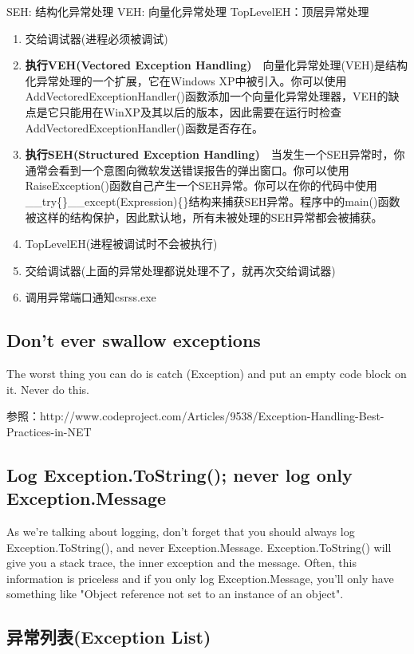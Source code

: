 \documentclass{book}
\begin{document}
SEH: 结构化异常处理
VEH: 向量化异常处理
TopLevelEH：顶层异常处理

\begin{enumerate}
\setcounter{enumi}{0}
\item{交给调试器(进程必须被调试)}
\item{\textbf{执行VEH(Vectored Exception Handling)}}~~向量化异常处理(VEH)是结构化异常处理的一个扩展，它在Windows XP中被引入。你可以使用AddVectoredExceptionHandler()函数添加一个向量化异常处理器，VEH的缺点是它只能用在WinXP及其以后的版本，因此需要在运行时检查AddVectoredExceptionHandler()函数是否存在。
\item{\textbf{执行SEH(Structured Exception Handling)}}~~当发生一个SEH异常时，你通常会看到一个意图向微软发送错误报告的弹出窗口。你可以使用RaiseException()函数自己产生一个SEH异常。你可以在你的代码中使用\_\_try\{\}\_\_except(Expression)\{\}结构来捕获SEH异常。程序中的main()函数被这样的结构保护，因此默认地，所有未被处理的SEH异常都会被捕获。
\item{TopLevelEH(进程被调试时不会被执行)}
\item{交给调试器(上面的异常处理都说处理不了，就再次交给调试器)}
\item{调用异常端口通知csrss.exe}
\end{enumerate}

\subsection{Don't ever swallow exceptions}

The worst thing you can do is catch (Exception) and put an empty code block on it. Never do this.

参照：http://www.codeproject.com/Articles/9538/Exception-Handling-Best-Practices-in-NET

\subsection{Log Exception.ToString(); never log only Exception.Message}

As we're talking about logging, don't forget that you should always log Exception.ToString(), 
and never Exception.Message. Exception.ToString() will give you a stack trace, 
the inner exception and the message. Often, this information is priceless and if you only log Exception.Message, 
you'll only have something like "Object reference not set to an instance of an object".

\subsection{异常列表(Exception List)}
\end{document}
